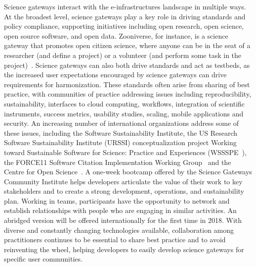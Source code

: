 \documentclass[review]{elsarticle}
\begin{document}
Science gateways interact with the e-infrastructures landscape in multiple ways. At the broadest level, science gateways play a key role in driving standards and policy compliance, supporting initiatives including open research, open science, open source software, and open data.  Zooniverse, for instance, is a science gateway that promotes open citizen science, where anyone can be in the seat of a researcher (and define a project) or a volunteer (and perform some task in the project)~\cite{zoo-76}. 
Science gateways can also both drive standards and act as testbeds, as the increased user expectations encouraged by science gateways can drive requirements for harmonization. These standards often arise from sharing of best practice, with communities of practice addressing issues including reproducibility, sustainability, interfaces to cloud computing, workflows, integration of scientific instruments, success metrics, usability studies, scaling, mobile applications and security. 
An increasing number of international organizations address some of these issues, including the Software Sustainability Institute, the US Research Software Sustainability Institute (URSSI) conceptualization project Working toward Sustainable Software for Science: Practice and Experiences (WSSSPE~\cite{wssspe}), the FORCE11 Software Citation Implementation Working Group~\cite{force11-39} and the Centre for Open Science~\cite{cio}. 
A one-week bootcamp offered by the Science Gateways Community Institute helps developers articulate the value of their work to key stakeholders and to create a strong development, operations, and sustainability plan. Working in teams, participants have the opportunity to network and establish relationships with people who are engaging in similar activities. An abridged version will be offered internationally for the first time in 2018. With diverse and constantly changing technologies available, collaboration among practitioners continues to be essential to share best practice and to avoid reinventing the wheel, helping developers to easily develop science gateways for specific user communities.
\end{document}
